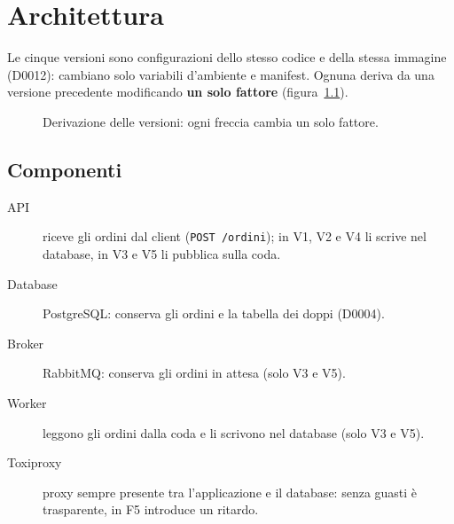 \chapter{Architettura}
\label{cap:architettura}

Le cinque versioni sono configurazioni dello stesso codice e della stessa immagine (D0012): cambiano solo variabili d'ambiente e manifest. Ognuna deriva da una versione precedente modificando \textbf{un solo fattore} (figura~\ref{fig:derivazione}).

\begin{figure}[htbp]
\centering
{}
\caption{Derivazione delle versioni: ogni freccia cambia un solo fattore.}
\label{fig:derivazione}
\end{figure}

\section{Componenti}

\begin{description}
  \item[API] riceve gli ordini dal client (\texttt{POST /ordini}); in V1, V2 e V4 li scrive nel database, in V3 e V5 li pubblica sulla coda.
  \item[Database] PostgreSQL: conserva gli ordini e la tabella dei doppi (D0004).
  \item[Broker] RabbitMQ: conserva gli ordini in attesa (solo V3 e V5).
  \item[Worker] leggono gli ordini dalla coda e li scrivono nel database (solo V3 e V5).
  \item[Toxiproxy] proxy sempre presente tra l'applicazione e il database: senza guasti è trasparente, in F5 introduce un ritardo.
\end{description}


